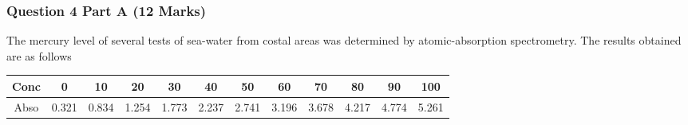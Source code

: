 \documentclass[a4paper,12pt]{article}
\begin{document}






\newpage











% 







%

%

%
%




\subsubsection*{Question 4 Part A (12 Marks)}
The mercury level of several tests of sea-water from costal areas was determined by atomic-absorption spectrometry. The results obtained are as follows
\begin{center}
	\begin{tabular}{|c||c|c|c|c|c|c|c|c|c|c|c|} \hline
		Conc &0 &10&20&30&40&50&60&70&80&90&100 \\ \hline 
		Abso &0.321& 0.834& 1.254& 1.773& 2.237& 2.741& 3.196& 3.678& 
		4.217& 4.774& 5.261 \\ \hline
	\end{tabular} 
	
\end{center}
\end{document}

